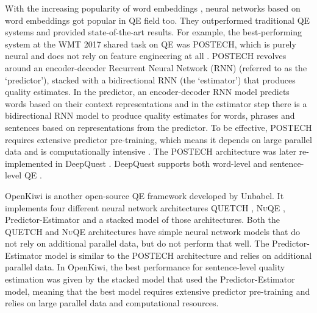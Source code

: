 With the increasing popularity of word embeddings \cite{DBLP:journals/corr/abs-1301-3781}, neural networks based on word embeddings got popular in QE field too. They outperformed traditional QE systems and provided state-of-the-art results. For example, the best-performing system at the WMT 2017 shared task on QE was \textsc{POSTECH}, which is purely neural and does not rely on feature engineering at all \cite{kim-etal-2017-predictor}. \textsc{POSTECH} revolves around an encoder-decoder Recurrent Neural Network (RNN) (referred to as the `predictor'), stacked with a bidirectional RNN (the `estimator') that produces quality estimates. In the predictor, an encoder-decoder RNN model predicts words based on their context representations and in the estimator step there is a bidirectional RNN model to produce quality estimates for words, phrases and sentences based on representations from the predictor. To be effective, \textsc{POSTECH} requires extensive predictor pre-training, which means it depends on large parallel data and is computationally intensive \cite{ive-etal-2018-deepquest}. The \textsc{POSTECH} architecture was later re-implemented in DeepQuest  \cite{ive-etal-2018-deepquest}. DeepQuest supports both word-level and sentence-level QE \cite{ive-etal-2018-deepquest}. 

OpenKiwi \cite{kepler-etal-2019-openkiwi} is another open-source QE framework developed by Unbabel. It implements four different neural network architectures \textsc{QUETCH} \cite{kreutzer-etal-2015-quality}, \textsc{NuQE} \cite{martins-etal-2016-unbabels}, Predictor-Estimator \cite{kim-etal-2017-predictor} and a stacked model of those architectures. Both the \textsc{QUETCH} and \textsc{NuQE} architectures have simple neural network models that do not rely on additional parallel data, but do not perform that well. The Predictor-Estimator model is similar to the \textsc{POSTECH} architecture and relies on additional parallel data. In OpenKiwi, the best performance for sentence-level quality estimation was given by the stacked model that used the Predictor-Estimator model, meaning that the best model requires extensive predictor pre-training and relies on large parallel data and computational resources. 

